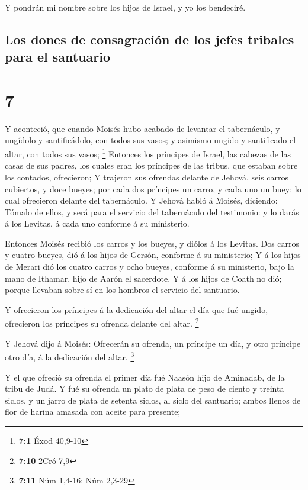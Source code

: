  Y pondrán mi nombre sobre los hijos de Israel, y yo los
bendeciré.

\hypertarget{los-dones-de-consagraciuxf3n-de-los-jefes-tribales-para-el-santuario}{%
\subsection{Los dones de consagración de los jefes tribales para el
santuario}\label{los-dones-de-consagraciuxf3n-de-los-jefes-tribales-para-el-santuario}}

\hypertarget{section-6}{%
\section{7}\label{section-6}}

 Y aconteció, que cuando Moisés hubo acabado de levantar el
tabernáculo, y ungídolo y santificádolo, con todos sus vasos; y asimismo
ungido y santificado el altar, con todos sus vasos; \footnote{\textbf{7:1}
  Éxod 40,9-10}  Entonces los príncipes de Israel, las
cabezas de las casas de sus padres, los cuales eran los príncipes de las
tribus, que estaban sobre los contados, ofrecieron;  Y
trajeron sus ofrendas delante de Jehová, seis carros cubiertos, y doce
bueyes; por cada dos príncipes un carro, y cada uno un buey; lo cual
ofrecieron delante del tabernáculo.  Y Jehová habló á
Moisés, diciendo:  Tómalo de ellos, y será para el servicio
del tabernáculo del testimonio: y lo darás á los Levitas, á cada uno
conforme á su ministerio.

 Entonces Moisés recibió los carros y los bueyes, y diólos á
los Levitas.  Dos carros y cuatro bueyes, dió á los hijos de
Gersón, conforme á su ministerio;  Y á los hijos de Merari
dió los cuatro carros y ocho bueyes, conforme á su ministerio, bajo la
mano de Ithamar, hijo de Aarón el sacerdote.  Y á los hijos
de Coath no dió; porque llevaban sobre sí en los hombros el servicio del
santuario.

 Y ofrecieron los príncipes á la dedicación del altar el
día que fué ungido, ofrecieron los príncipes su ofrenda delante del
altar. \footnote{\textbf{7:10} 2Cró 7,9}

 Y Jehová dijo á Moisés: Ofrecerán su ofrenda, un príncipe
un día, y otro príncipe otro día, á la dedicación del altar. \footnote{\textbf{7:11}
  Núm 1,4-16; Núm 2,3-29}

 Y el que ofreció su ofrenda el primer día fué Naasón hijo
de Aminadab, de la tribu de Judá.  Y fué su ofrenda un
plato de plata de peso de ciento y treinta siclos, y un jarro de plata
de setenta siclos, al siclo del santuario; ambos llenos de flor de
harina amasada con aceite para presente;

